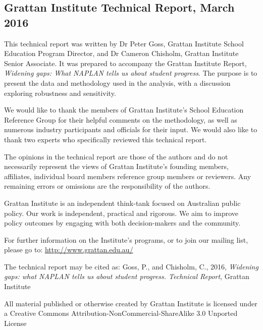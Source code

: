 \small
\vspace{8pt}
\subsection*{Grattan Institute Technical Report, March 2016}

\raggedright

This technical report was written by Dr Peter Goss, Grattan Institute School Education Program Director, and Dr Cameron Chisholm, Grattan Institute Senior Associate. It was prepared to accompany the Grattan Institute Report, \textit{Widening gaps: What NAPLAN tells us about student progress}. The purpose is to present the data and methodology used in the analysis, with a discussion exploring robustness and sensitivity.

We would like to thank the members of Grattan Institute's School Education Reference Group for their helpful comments on the methodology, as well as numerous industry participants and officials for their input. We would also like to thank two experts who specifically reviewed this technical report.

The opinions in the technical report are those of the authors and do not necessarily represent the views of Grattan Institute’s founding members, affiliates, individual board members reference group members or reviewers. Any remaining errors or omissions are the responsibility of the authors.

Grattan Institute is an independent think-tank focused on Australian public policy. Our work is independent, practical and rigorous. We aim to improve policy outcomes by engaging with both decision-makers and the community.

For further information on the Institute's programs, or to join our mailing list, please go to:
\url{http://www.grattan.edu.au/}

\footnotesize

The technical report may be cited as:
\newline
Goss, P., and Chisholm, C., 2016, \textit{Widening gaps: what NAPLAN tells us about student progress. Technical Report}, Grattan Institute

All material published or otherwise created by Grattan Institute is licensed under a Creative Commons Attribution-NonCommercial-ShareAlike 3.0 Unported License
\normalsize
